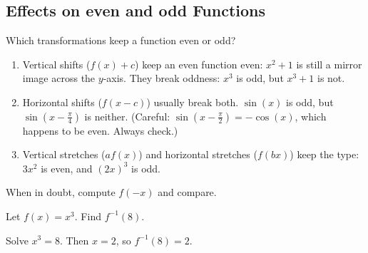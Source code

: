 \subsection{Effects on even and odd Functions}
Which transformations keep a function even or odd?
\begin{enumerate}
    \item Vertical shifts ($f(x) + c$) keep an even
          function even: $x^2 + 1$ is still a mirror image across the
          $y$-axis. They break oddness: $x^3$ is odd, but
          $x^3 + 1$ is not.
    \item Horizontal shifts ($f(x - c)$) usually break both. $\sin(x)$ is
          odd, but $\sin(x - \frac{\pi}{4})$ is neither. (Careful:
          $\sin(x - \frac{\pi}{2}) = -\cos(x)$, which happens to be even.
          Always check.)
    \item Vertical stretches ($a f(x)$) and horizontal stretches ($f(bx)$)
          keep the type: $3x^2$ is even, and $(2x)^3$ is odd.
\end{enumerate}
When in doubt, compute $f(-x)$ and compare.

\begin{Exercise}[title={Inverse of a Cube}, label=inv1]
Let $f(x) = x^3$. Find $f^{-1}(8)$.
\end{Exercise}
\begin{Answer}[ref=inv1]
Solve $x^3 = 8$. Then $x = 2$, so $f^{-1}(8) = 2$.
\end{Answer}
